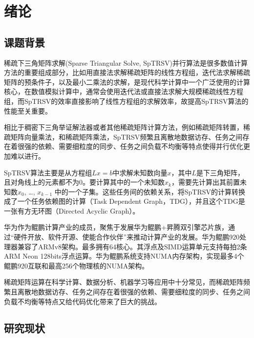 \chapter{绪论}
\section{课题背景}

稀疏下三角矩阵求解(Sparse Triangular Solve, SpTRSV)并行算法是很多数值计算方法的重要组成部分，比如用直接法求解稀疏矩阵的线性方程组\cite{davis2006direct}，迭代法求解稀疏矩阵的预条件子\cite{elman1982iterative}，以及最小二乘法的求解\cite{saad2003iterative}，是现代科学计算中一个广泛使用的计算核心，在数值模拟计算中，通常会使用迭代法或直接法求解大规模稀疏线性方程组，而SpTRSV的效率直接影响了线性方程组的求解效率，故提高SpTRSV算法的性能至关重要。

相比于稠密下三角举证解法器\cite{hogg2013fast}或者其他稀疏矩阵计算方法，例如稀疏矩阵转置\cite{wang2016parallel}，稀疏矩阵向量乘法\cite{liu2015csr5}\cite{liu2015speculative}，和稀疏矩阵乘法\cite{liu2015framework}，SpTRSV频繁且离散地数据访存、任务之间存在着很强的依赖、需要细粒度的同步、任务之间负载不均衡等特点使得并行优化更加难以进行。

SpTRSV算法主要是从方程组$Lx=b$中求解未知数向量$ x $，其中$ L $是下三角矩阵，且对角线上的元素都不为0。要计算其中的一个未知数$x_k$，需要先计算出其前置未知数$x_0$, \dots, $x_{k-1}$ 中的一个子集。这些任务间的依赖关系，将SpTRSV的计算转换成了一个任务依赖图的计算（Task Dependent Graph，TDG），并且这个TDG是一张有方无环图（Directed Acyclic Graph）。

华为作为鲲鹏计算产业的成员，聚焦于发展华为鲲鹏+昇腾双引擎芯片族，通过“硬件开放、软件开源、使能合作伙伴”来推动计算产业的发展。华为鲲鹏920处理器兼容了ARMv8架构。最多拥有64核心。其浮点及SIMD运算单元支持每拍2条ARM Neon 128bits浮点运算。华为鲲鹏系统支持NUMA内存架构，实现最多4个鲲鹏920互联和最高256个物理核的NUMA架构。 

稀疏矩阵运算在科学计算、数据分析、机器学习等应用中十分常见，而稀疏矩阵频繁且离散地数据访存、任务之间存在着很强的依赖、需要细粒度的同步、任务之间负载不均衡等特点又给代码优化带来了巨大的挑战。


\section{研究现状}

\begin{figure}[htbp]
    \centering
    \centering
\end{figure}

